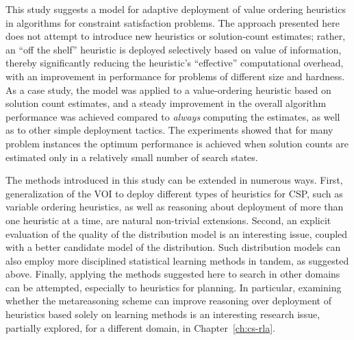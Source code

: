 This study suggests a model for adaptive deployment of value ordering
heuristics in algorithms for constraint satisfaction problems. The
approach presented here does not attempt to introduce new
heuristics or solution-count estimates; rather, an ``off the shelf''
heuristic is deployed selectively based on value of information,
thereby significantly reducing the heuristic's ``effective''
computational overhead, with an improvement in performance for
problems of different size and hardness. As a case study, the model
was applied to a value-ordering heuristic based on solution count
estimates, and a steady improvement in the overall algorithm
performance was achieved compared to {\em always} computing the
estimates, as well as to other simple deployment tactics.  The
experiments showed that for many problem instances the optimum
performance is achieved when solution counts are estimated only in a
relatively small number of search states.

The methods introduced in this study can be extended in numerous
ways. First, generalization of the VOI to deploy different types of
heuristics for CSP, such as variable ordering heuristics, as well as
reasoning about deployment of more than one heuristic at a time, are
natural non-trivial extensions. Second, an explicit evaluation of the
quality of the distribution model is an interesting issue, coupled
with a better candidate model of the distribution.  Such distribution
models can also employ more disciplined statistical learning methods
in tandem, as suggested above. Finally, applying the methods suggested
here to search in other domains can be attempted, especially
to heuristics for planning.  In particular, examining whether
the metareasoning scheme can improve reasoning over deployment of
heuristics based solely on learning methods is an interesting
research issue, partially explored, for a different domain,
in Chapter~\ref{ch:cs-rla}.
